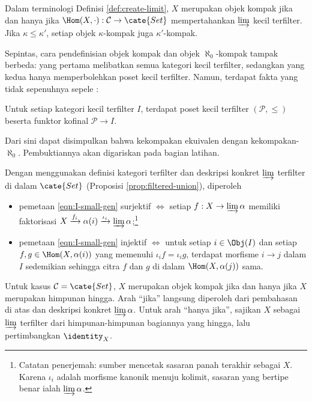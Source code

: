 Dalam terminologi Definisi \ref{def:create-limit}, $X$ merupakan objek kompak jika dan hanya jika $\Hom(X, \cdot): \mathcal{C} \to \cate{Set}$ mempertahankan $\varinjlim$ kecil terfilter. Jika $\kappa \leq \kappa'$, setiap objek $\kappa$-kompak juga $\kappa'$-kompak.

\begin{remark}\label{rem:filtered-poset}
	Sepintas, cara pendefinisian objek kompak dan objek $\aleph_0$-kompak tampak berbeda: yang pertama melibatkan semua kategori kecil terfilter, sedangkan yang kedua hanya memperbolehkan poset kecil terfilter. Namun, terdapat fakta yang tidak sepenuhnya sepele \cite[Teorema 1.5]{AR94}:
	\begin{center}\begin{minipage}{0.7\textwidth}
		Untuk setiap kategori kecil terfilter $I$, terdapat poset kecil terfilter $(\mathcal{P}, \leq)$ beserta funktor kofinal $\mathcal{P} \to I$.
	\end{minipage}\end{center}
	Dari sini dapat disimpulkan bahwa kekompakan ekuivalen dengan kekompakan-$\aleph_0$. Pembuktiannya akan digariskan pada bagian latihan.
\end{remark}

Dengan menggunakan definisi kategori terfilter dan deskripsi konkret $\varinjlim$ terfilter di dalam $\cate{Set}$ (Proposisi \ref{prop:filtered-union}), diperoleh
\begin{itemize}
	\item pemetaan \eqref{eqn:I-small-gen} surjektif $\iff$ setiap $f: X \to \varinjlim \alpha$ memiliki faktorisasi $X \xrightarrow{f_i} \alpha(i) \xrightarrow{\iota_i} \varinjlim \alpha$;\footnote{Catatan penerjemah: sumber mencetak sasaran panah terakhir sebagai $X$. Karena $\iota_i$ adalah morfisme kanonik menuju kolimit, sasaran yang bertipe benar ialah $\varinjlim\alpha$.}
	\item pemetaan \eqref{eqn:I-small-gen} injektif $\iff$ untuk setiap $i \in \Obj(I)$ dan setiap $f, g \in \Hom(X, \alpha(i))$ yang memenuhi $\iota_i f = \iota_i g$, terdapat morfisme $i \to j$ dalam $I$ sedemikian sehingga citra $f$ dan $g$ di dalam $\Hom(X, \alpha(j))$ sama.
\end{itemize}

\begin{example}\label{eg:Set-cpt}
	Untuk kasus $\mathcal{C} = \cate{Set}$, $X$ merupakan objek kompak jika dan hanya jika $X$ merupakan himpunan hingga. Arah ``jika'' langsung diperoleh dari pembahasan di atas dan deskripsi konkret $\varinjlim \alpha$. Untuk arah ``hanya jika'', sajikan $X$ sebagai $\varinjlim$ terfilter dari himpunan-himpunan bagiannya yang hingga, lalu pertimbangkan $\identity_X$.
\end{example}

